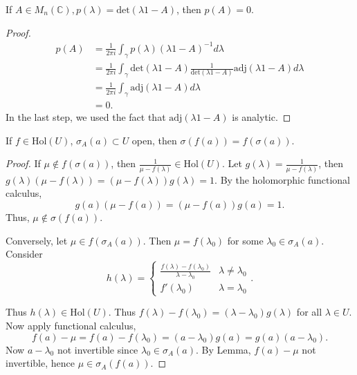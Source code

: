 
\begin{corollary}
	\label{cor:CayleyHamilton}
	If $A \in M_n(\mathbb{C}), p(\lambda) = \text{det}(\lambda 1 - A)$, then $p(A) = 0$.
\end{corollary}
\begin{proof}
	\begin{align*}
		p(A)
		&= \frac{1}{2 \pi i} \int _\gamma p(\lambda) (\lambda 1 - A)^{-1} d \lambda \\
		&= \frac{1}{2 \pi i} \int _\gamma \text{det}(\lambda 1 - A) \frac{1}{\text{det}(\lambda 1 - A)} \text{adj}(\lambda 1 - A) d \lambda \\
		&= \frac{1}{2 \pi i} \int _{\gamma} \text{adj}(\lambda 1 - A) d \lambda \\
		&= 0 
	.\end{align*}
	In the last step, we used the fact that $\text{adj}(\lambda 1 - A)$ is analytic.
\end{proof}

\begin{theorem}
	\label{thm:SpectralMappingThm}
	If $f \in \text{Hol}(U)$, $\sigma_A(a) \subset U$ open, then $\sigma(f(a)) = f(\sigma(a))$.
\end{theorem}
\begin{proof}
	If $\mu \not\in f(\sigma(a))$, then $\frac{1}{\mu - f(\lambda)} \in \text{Hol}(U)$. 
	Let $g(\lambda) = \frac{1}{\mu - f(\lambda)}$, then $g(\lambda) (\mu - f(\lambda)) = (\mu - f(\lambda)) g(\lambda) = 1$. By the holomorphic functional calculus, 
	\[
		g(a) (\mu - f(a)) = (\mu - f(a)) g(a) = 1
	.\] 
	Thus, $\mu \not\in  \sigma(f(a))$.

	Conversely, let $\mu \in f(\sigma_A(a))$. Then $\mu = f(\lambda_0) $ for some $\lambda_0 \in \sigma_A(a)$.
	Consider
	\[
		h(\lambda) = 
		\begin{cases}
			\frac{f(\lambda) - f(\lambda_0)}{\lambda - \lambda_0} & \lambda \neq \lambda_0\\
			f'(\lambda_0) & \lambda = \lambda_0
		\end{cases}
	.\] 

	Thus $h(\lambda) \in \text{Hol}(U)$. Thus $f(\lambda) - f(\lambda_0) = (\lambda - \lambda_0) g(\lambda)$ for all $\lambda \in U$. Now apply functional calculus,
	\[
		f(a) - \mu = f(a) - f(\lambda_0)= (a - \lambda_0) g(a) = g(a) (a - \lambda_0)
	.\] 
	Now $a - \lambda_0$ not invertible since $\lambda_0 \in \sigma_A(a)$. By Lemma, $f(a) - \mu$ not invertible, hence $\mu \in \sigma_A(f(a))$.

\end{proof}

